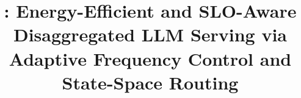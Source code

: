 \documentclass[conference]{IEEEtran}
\begin{document}
\title{\cameraready{\name}: Energy-Efficient and SLO-Aware Disaggregated LLM Serving via Adaptive Frequency Control and State-Space Routing}



\end{document}
